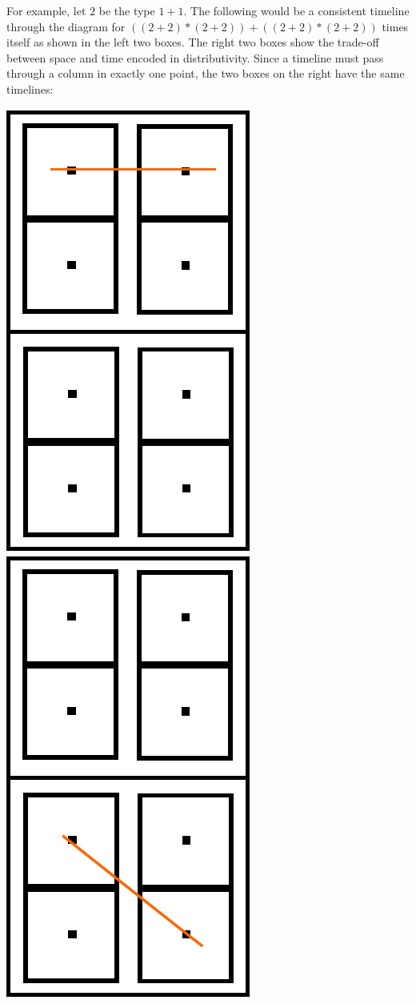 \documentclass{article}
\begin{document}
For example, let $2$ be the type $1 + 1$. The following would be a
consistent timeline through the diagram for
$((2 + 2) * (2 + 2)) + ((2 + 2) * (2 + 2))$ times itself as shown in
the left two boxes. The right two boxes show the trade-off between
space and time encoded in distributivity. Since a timeline must pass
through a column in exactly one point, the two boxes on the right have
the same timelines:
\begin{center}
\includegraphics[scale=0.3]{images/tall-tl-1}
\quad
\includegraphics[scale=0.3]{images/tall-tl-2}

\end{center}
\end{document}
